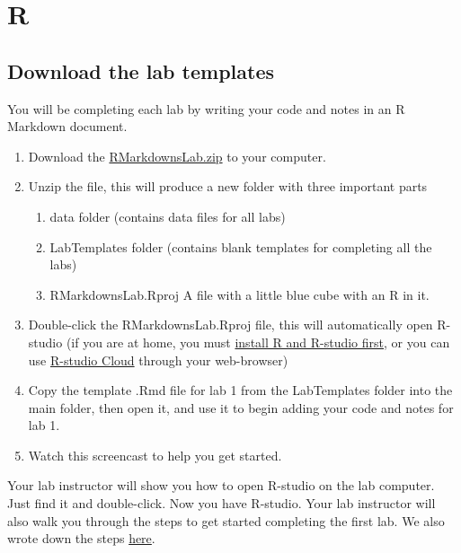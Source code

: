 \documentclass[
]{book}
\providecommand{\tightlist}{%
  \setlength{\itemsep}{0pt}\setlength{\parskip}{0pt}}
\begin{document}
\hypertarget{r-1}{%
\section{R}\label{r-1}}

\hypertarget{download-the-lab-templates}{%
\subsection{Download the lab templates}\label{download-the-lab-templates}}

You will be completing each lab by writing your code and notes in an R Markdown document.

\begin{enumerate}
\def\labelenumi{\arabic{enumi}.}
\tightlist
\item
  Download the \href{https://github.com/CrumpLab/statisticsLab/raw/master/RMarkdownsLab.zip}{RMarkdownsLab.zip} to your computer.
\item
  Unzip the file, this will produce a new folder with three important parts

  \begin{enumerate}
  \def\labelenumii{\alph{enumii}.}
  \tightlist
  \item
    data folder (contains data files for all labs)
  \item
    LabTemplates folder (contains blank templates for completing all the labs)
  \item
    RMarkdownsLab.Rproj A file with a little blue cube with an R in it.
  \end{enumerate}
\item
  Double-click the RMarkdownsLab.Rproj file, this will automatically open R-studio (if you are at home, you must \href{https://crumplab.github.io/statisticsLab/software.html\#installing-r-and-r-studio}{install R and R-studio first}, or you can use \href{https://crumplab.github.io/statisticsLab/software.html\#r-studio-cloud}{R-studio Cloud} through your web-browser)
\item
  Copy the template .Rmd file for lab 1 from the LabTemplates folder into the main folder, then open it, and use it to begin adding your code and notes for lab 1.
\item
  Watch this screencast to help you get started.
\end{enumerate}

Your lab instructor will show you how to open R-studio on the lab computer. Just find it and double-click. Now you have R-studio. Your lab instructor will also walk you through the steps to get started completing the first lab. We also wrote down the steps \href{https://crumplab.github.io/statisticsLab/software.html\#how-to-complete-the-r-labs}{here}.
\end{document}
